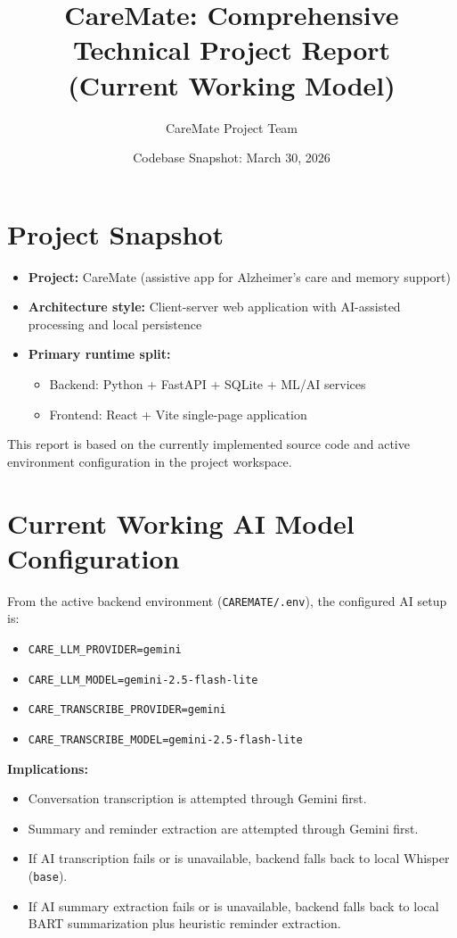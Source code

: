 \documentclass[12pt,a4paper]{article}
\title{\textbf{CareMate: Comprehensive Technical Project Report}\\\large(Current Working Model)}
\author{CareMate Project Team}
\date{Codebase Snapshot: March 30, 2026}
\begin{document}
\maketitle
\tableofcontents
\newpage

\section{Project Snapshot}
\begin{itemize}
  \item \textbf{Project:} CareMate (assistive app for Alzheimer's care and memory support)
  \item \textbf{Architecture style:} Client-server web application with AI-assisted processing and local persistence
  \item \textbf{Primary runtime split:}
  \begin{itemize}
    \item Backend: Python + FastAPI + SQLite + ML/AI services
    \item Frontend: React + Vite single-page application
  \end{itemize}
\end{itemize}

This report is based on the currently implemented source code and active environment configuration in the project workspace.

\section{Current Working AI Model Configuration}
From the active backend environment (\texttt{CAREMATE/.env}), the configured AI setup is:
\begin{itemize}
  \item \texttt{CARE\_LLM\_PROVIDER=gemini}
  \item \texttt{CARE\_LLM\_MODEL=gemini-2.5-flash-lite}
  \item \texttt{CARE\_TRANSCRIBE\_PROVIDER=gemini}
  \item \texttt{CARE\_TRANSCRIBE\_MODEL=gemini-2.5-flash-lite}
\end{itemize}

\textbf{Implications:}
\begin{itemize}
  \item Conversation transcription is attempted through Gemini first.
  \item Summary and reminder extraction are attempted through Gemini first.
  \item If AI transcription fails or is unavailable, backend falls back to local Whisper (\texttt{base}).
  \item If AI summary extraction fails or is unavailable, backend falls back to local BART summarization plus heuristic reminder extraction.
\end{itemize}
\end{document}
